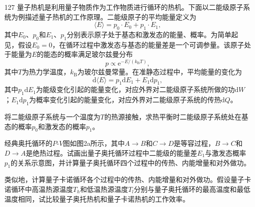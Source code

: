 \begin{problem}[第37届全国中学生物理竞赛决赛][量子热机]{127}
    量子热机是利用量子物质作为工作物质进行循环的热机。下面以二能级原子系统为例描述量子热机的工作原理。二能级原子的平均能量定义为
    \begin{equation}
        \langle E \rangle = p _ {0} \cdot E _ {0} + p _ {1} \cdot E _ {1},
        \label{eq:1.p127}
    \end{equation}
    其中$E _ { 0 }$、$p _ { 0 }$和$E _ { 1 }$、$p _ { 1 }$分别表示原子处于基态和激发态的能量、概率。为简单起见，假设$E _ { 0 } = 0$，在循环过程中激发态与基态的能量差是一个可调参量。该原子处于能量为$E$的能态的概率满足玻尔兹曼分布
    \begin{equation}
        p \propto \mathrm{e} ^ {- E / (k _ {\mathrm{B}} T)},
        \label{eq:2.p127}
    \end{equation}
    其中$T$为热力学温度，$k _ { \mathrm { B } }$为玻尔兹曼常量。在准静态过程中，平均能量的变化为
    \begin{equation}
        \mathrm{d} \langle E \rangle = p _ {1} \mathrm{d} E _ {1} + E _ {1} \mathrm{d} p _ {1},
        \label{eq:3.p127}
    \end{equation}
    其中$p _ { 1 } \mathrm { d } E _ { 1 }$为能级变化引起的能量变化，对应外界对二能级原子系统所做的功$\mathrm{d}W$；$E _ { 1 } \mathrm { d } p _ { 1 }$为概率变化引起的能量变化，对应外界对二能级原子系统的传热$\mathrm{d}Q$。
    \begin{subproblem}
        将二能级原子系统与一个温度为$T$的热源接触，求热平衡时二能级原子系统处在基态的概率$p _ { 0 }$和激发态的概率$p _ { 1 }$。
    \end{subproblem}
    \begin{subproblem}
        经典奥托循环的$P$-$V$图如图2a所示，其中$A \to B$和$C \to D$是等容过程，$B \to C$和$D \to A$是绝热过程。试画出量子奥托循环过程中二能级的能量差$E _ { 1 }$与激发态概率$p _ { 1 }$的关系示意图，并计算量子奥托循环四个过程中的传热、内能增量和对外做功。
    \end{subproblem}
    \begin{subproblem}
        类似地，计算量子卡诺循环各个过程中的传热、内能增量和对外做功。假设量子卡诺循环中高温热源温度$T _ { h }$和低温热源温度$T _ { l }$分别与量子奥托循环的最高温度和最低温度相同，试比较量子奥托热机和量子卡诺热机的工作效率。
    \end{subproblem}
\end{problem}